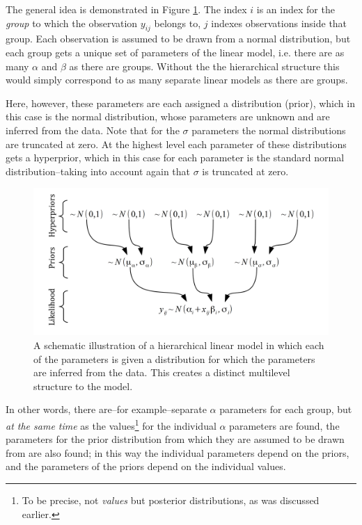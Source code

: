 \documentclass{article}\usepackage{knitr}
\begin{document}
The general idea is demonstrated in Figure \ref{fig:hierarchical_model_for_groups}. The index $i$ is an index for the \textit{group} to which the observation $y_{ij}$ belongs to, $j$ indexes observations inside that group. Each observation is assumed to be drawn from a normal distribution, but each group gets a unique set of parameters of the linear model, i.e. there are as many $\alpha$ and $\beta$ as there are groups. Without the the hierarchical structure this would simply correspond to as many separate linear models as there are groups.  

Here, however, these parameters are each assigned a distribution (prior), which in this case is the normal distribution, whose parameters are unknown and are inferred from the data. Note that for the $\sigma$ parameters the normal distributions are truncated at zero. At the highest level each parameter of these distributions gets a hyperprior, which in this case for each parameter is the standard normal distribution--taking into account again that $\sigma$ is truncated at zero.

\begin{figure}[!htb]
\includegraphics{Hierarchical_model_for_groups}
\caption{A schematic illustration of a hierarchical linear model in which each of the parameters is given a distribution for which the parameters are inferred from the data. This creates a distinct multilevel structure to the model.}
\label{fig:hierarchical_model_for_groups}
\end{figure}

In other words, there are--for example--separate $\alpha$ parameters for each group, but \textit{at the same time} as the values\footnote{To be precise, not \textit{values} but posterior distributions, as was discussed earlier.} for the individual $\alpha$ parameters are found, the parameters for the prior distribution from which they are assumed to be drawn from are also found; in this way the individual parameters depend on the priors, and  the parameters of the priors depend on the individual values.
\end{document}
